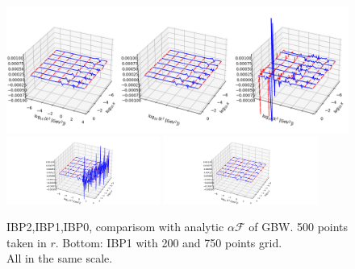 \documentclass[12pt]{article}
\begin{document}
\begin{figure}
\includegraphics[width=\textwidth]{compare-gbw-500.png}
\includegraphics[width=0.45\textwidth]{ibp1-200.png}
\includegraphics[width=0.45\textwidth]{ibp1-750.png}
\caption{IBP2,IBP1,IBP0, comparisom with analytic $\alpha\mathcal{F}$ of GBW. 500 points taken in $r$.
Bottom: IBP1 with 200 and 750 points grid.\\
All in the same scale.
 }
\end{figure}
\end{document}
